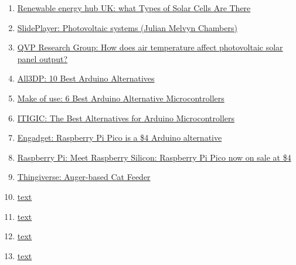\documentclass[12pt]{article}
\begin{document}
\begin{enumerate}
			\item 
			\label{bib: renewable energy hub main types photo cells}
			\href{https://www.renewableenergyhub.co.uk/main/solar-panels/types-of-solar-cell/}{Renewable energy hub UK: what Types of Solar Cells Are There}
			
			\item 
			\label{bib: SlidePlayer Photovoltaic systems}
			\href{https://slideplayer.com/slide/9144319/}{SlidePlayer: Photovoltaic systems (Julian Melvyn Chambers)}
			
			\item 
			\label{bib: QVP air temp affect solar panel output}
			\href{https://www.qpvgroup.org/blog/2019/2/3/how-does-air-temperature-affect-photovoltaic-solar-panel-output}{QVP Research Group: How does air temperature affect photovoltaic solar panel output?}
			
			\item 
			\label{bib: arduino alternatives}
			\href{https://all3dp.com/2/best-arduino-alternatives/}{All3DP: 10 Best Arduino Alternatives}
			
			\item 
			\label{bib: microcontrollers alternative to arduino}
			\href{https://www.makeuseof.com/tag/best-arduino-alternative-microcontrollers/}{Make of use: 6 Best Arduino Alternative Microcontrollers}
			
			\item 
			\label{bib: alternative to arduino}
			\href{https://itigic.com/best-alternatives-for-arduino-microcontrollers/}{ITIGIC: The Best Alternatives for Arduino Microcontrollers}
			
			\item 
			\label{bib: raspberry pi pico}
			\href{https://www.engadget.com/raspberry-pi-pico-microcontroller-154235348.html?guccounter=1}{Engadget: Raspberry Pi Pico is a \$4 Arduino alternative}
			
						
			\item 
			\label{bib: raspberry pi pico 2}
			\href{https://www.raspberrypi.org/blog/raspberry-pi-silicon-pico-now-on-sale/}{Raspberry Pi: Meet Raspberry Silicon: Raspberry Pi Pico now on sale at \$4}
			
						
			\item 
			\label{bib: thingiverse helices comedero}
			\href{https://www.thingiverse.com/thing:27854}{Thingiverse: Auger-based Cat Feeder}
			
						
			\item 
			\label{bib: link12}
			\href{URL}{text}
			
						
			\item 
			\label{bib: link12}
			\href{URL}{text}
			
						
			\item 
			\label{bib: link12}
			\href{URL}{text}
			
						
			\item 
			\label{bib: link12}
			\href{URL}{text}
			
			
		\end{enumerate}
		
\end{document}
